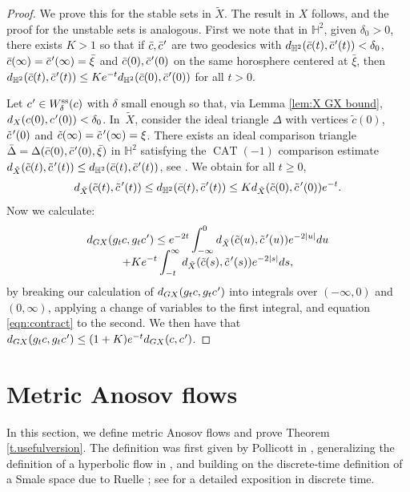 \documentclass[10pt]{amsart}
\newcommand{\cpr}{c\mkern1mu'}
\newcommand{\bcpr}{\bar c\mkern1mu'}
\newcommand{\tcpr}{\tilde c\mkern2mu'}
\newcommand{\sts}{\mathrm{ss}}
\theoremstyle{definition}
\numberwithin{equation}{section}
\DeclareMathOperator{\CAT}{CAT}
\begin{document}
\begin{proof}
We prove this for the stable sets in $\tilde X$. The result in $X$ follows, and the proof for the unstable sets is analogous. First we note that in $\mathbb{H}^2$, given $\delta_0>0$, there exists $K>1$ so that if $\bar c, \bcpr$ are two geodesics with $d_{\mathbb{H}^2}(\bar c(t), \bcpr(t) ) < \delta_0$, $\bar c(\infty)= \bcpr(\infty) = \bar \xi$ and $\bar c(0), \bcpr(0)$ on the same horosphere centered at $\bar \xi$, then $d_{\mathbb{H}^2}(\bar c(t), \bcpr(t) ) \leq K e^{-t} d_{\mathbb{H}^2}(\bar c(0), \bcpr(0)) $ for all $t>0$.

Let $\cpr \in W^{\sts}_\delta(c)$ with $\delta$ small enough so that, via Lemma \ref{lem:X GX bound}, $d_X( c(0), \cpr(0)) <\delta_0 $. In~$\tilde X$, consider the ideal triangle $\Delta$ with vertices $ \tilde c(0)$, $\tcpr(0)$ and \hbox{$\tilde c(\infty)= \tcpr(\infty)=\xi$}.
There exists an ideal comparison triangle $\bar\Delta= \Delta(\bar c(0), \bcpr(0), \bar\xi)$ in $\mathbb{H}^2$ satisfying the $\CAT(-1)$ comparison estimate $d_{\tilde X}(\tilde c(t), \tcpr(t)) \leq d_{\mathbb{H}^2}(\bar c(t), \bcpr(t))$, see \cite[Prop.\,4.4.13]{das-simmons-urbanski}. We obtain for all $t\geq 0$,
\begin{equation}\label{eqn:contract}
d_{\tilde X}(\tilde c(t), \tcpr(t)) \leq d_{\mathbb{H}^2}(\bar c(t), \bcpr(t)) \leq K d_{\tilde X}(\tilde c(0),\tcpr(0)) e^{-t}.
\end{equation}
Now we calculate:
\begin{multline*}
d_{G X}(g_t c, g_t \cpr) \leq e^{-2t} \int_{-\infty}^0 d_{\tilde X}(\tilde c(u),\tcpr(u)) e^{-2|u|}du\\[-8pt]
+ K e^{-t} \int_{-t}^\infty d_{\tilde X}(\tilde c(s),\tcpr(s)) e^{-2|s|} ds,
\end{multline*}
by breaking our calculation of $d_{G X}(g_t c, g_t \cpr)$ into integrals over $(-\infty,0)$ and $(0,\infty)$, applying a change of variables to the first integral, and equation \eqref{eqn:contract} to the second. We then have that $d_{G X}(g_t c, g_t \cpr) \leq (1+K)e^{-t} d_{G X}(c,\cpr)$.
\end{proof}

\section{Metric Anosov flows}\label{sec:Markov}

In this section, we define metric Anosov flows and prove Theorem \ref{t.usefulversion}. The definition was first given by Pollicott in \cite{pollicott}, generalizing the definition of a hyperbolic flow in \cite{bowen-periodic, bowen-symbolic}, and building on the discrete-time definition of a Smale space due to Ruelle \cite{Ruelle}; see \cite{iP2014} for a detailed exposition in discrete time.
\end{document}
